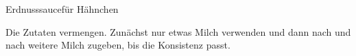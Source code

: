 \begin{recipe}{Erdnusssauce}{für Hähnchen}
  \label{Marinade}
  \inglist

  \steps
  Die Zutaten vermengen. Zunächst nur etwas Milch verwenden und dann nach und
  nach weitere Milch zugeben, bis die Konsistenz passt.
\end{recipe}
